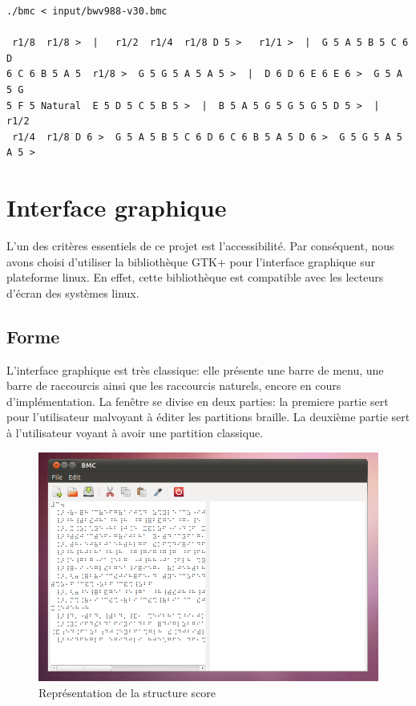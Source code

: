 \begin{verbatim}
./bmc < input/bwv988-v30.bmc 

 r1/8  r1/8 >  |   r1/2  r1/4  r1/8 D 5 >   r1/1 >  |  G 5 A 5 B 5 C 6 D 
6 C 6 B 5 A 5  r1/8 >  G 5 G 5 A 5 A 5 >  |  D 6 D 6 E 6 E 6 >  G 5 A 5 G 
5 F 5 Natural  E 5 D 5 C 5 B 5 >  |  B 5 A 5 G 5 G 5 G 5 D 5 >  |   r1/2 
 r1/4  r1/8 D 6 >  G 5 A 5 B 5 C 6 D 6 C 6 B 5 A 5 D 6 >  G 5 G 5 A 5 A 5 > 
\end{verbatim}

\section{Interface graphique}

L'un des critères essentiels de ce projet est l'accessibilité. Par
conséquent, nous avons choisi d'utiliser la bibliothèque GTK+ pour
l'interface graphique sur plateforme linux. En effet, cette
bibliothèque est compatible avec les lecteurs d'écran des systèmes
linux.


\subsection*{Forme}
L'interface graphique est très classique: elle présente une barre de
menu, une barre de raccourcis ainsi que les raccourcis naturels,
encore en cours d'implémentation. La fenêtre se divise en deux
parties: la premiere partie sert pour l'utilisateur malvoyant à éditer les partitions braille. La
deuxième partie sert à l'utilisateur voyant à avoir une partition
classique.

\begin{center}
\begin{figure}[!h]
  \includegraphics[scale=0.65]{images/linux_gui.png}
  \caption{Représentation de la structure score}
\end{figure}
\end{center}



